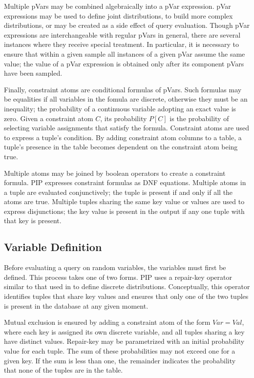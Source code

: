 Multiple pVars may be combined algebraically into a pVar expression.  pVar expressions may be used to define joint distributions, to build more complex distributions, or may be created as a side effect of query evaluation.  Though pVar expressions are interchangeable with regular pVars in general, there are several instances where they receive special treatment.  In particular, it is necessary to ensure that within a given sample all instances of a given pVar assume the same value; the value of a pVar expression is obtained only after its component pVars have been sampled.

Finally, constraint atoms are conditional formulas of pVars.  Such formulas may be equalities if all variables in the fomula are discrete, otherwise they must be an inequality; the probability of a continuous variable adopting an exact value is zero.  Given a constraint atom $C$, its probability $P[C]$ is the probability of selecting variable assignments that satisfy the formula.  Constraint atoms are used to express a tuple's condition.  By adding constraint atom columns to a table, a tuple's presence in the table becomes dependent on the constraint atom being true.  

Multiple atoms may be joined by boolean operators to create a constraint formula.  PIP expresses constraint formulas as DNF equations.  Multiple atoms in a tuple are evaluated conjunctively; the tuple is present if and only if all the atoms are true.  Multiple tuples sharing the same key value or values are used to express disjunctions; the key value is present in the output if any one tuple with that key is present.

\subsection{Variable Definition}
Before evaluating a query on random variables, the variables must first be defined.  This process takes one of two forms.  PIP uses a repair-key operator similar to that used in \cite{KochMayBMS2008} to define discrete distributions.  Conceptually, this operator identifies tuples that share key values and ensures that only one of the two tuples is present in the database at any given moment.  

Mutual exclusion is ensured by adding a constraint atom of the form $Var = Val$, where each key is assigned its own discrete variable, and all tuples sharing a key have distinct values.  Repair-key may be parametrized with an initial probability value for each tuple.  The sum of these probabilities may not exceed one for a given key.  If the sum is less than one, the remainder indicates the probability that none of the tuples are in the table.

